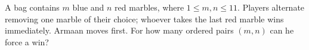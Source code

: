 A bag contains $m$ blue and $n$ red marbles, where $1\le m,n\le11$. Players alternate removing one marble of their choice; whoever takes the last red marble wins immediately. Armaan moves first. For how many ordered pairs $(m,n)$ can he force a win?
